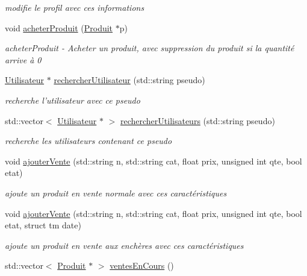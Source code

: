 \begin{DoxyCompactItemize}
\begin{DoxyCompactList}\small\item\em modifie le profil avec ces informations \end{DoxyCompactList}\item 
void \hyperlink{class_gestion_bdd_a34b4f9816d96e49889a6455f974e21ee}{acheter\-Produit} (\hyperlink{class_produit}{Produit} $\ast$p)
\begin{DoxyCompactList}\small\item\em acheter\-Produit -\/ Acheter un produit, avec suppression du produit si la quantité arrive à 0 \end{DoxyCompactList}\item 
\hyperlink{class_utilisateur}{Utilisateur} $\ast$ \hyperlink{class_gestion_bdd_a59989c7d58166c7e4a451b77e56bb852}{rechercher\-Utilisateur} (std\-::string pseudo)
\begin{DoxyCompactList}\small\item\em recherche l'utilisateur avec ce pseudo \end{DoxyCompactList}\item 
std\-::vector$<$ \hyperlink{class_utilisateur}{Utilisateur} $\ast$ $>$ \hyperlink{class_gestion_bdd_a96636fecdc9750ebd4236b3c58aed84f}{rechercher\-Utilisateurs} (std\-::string pseudo)
\begin{DoxyCompactList}\small\item\em recherche les utilisateurs contenant ce pseudo \end{DoxyCompactList}\item 
void \hyperlink{class_gestion_bdd_ac8c3809d6de97f0e81cd5045a4a72c7e}{ajouter\-Vente} (std\-::string n, std\-::string cat, float prix, unsigned int qte, bool etat)
\begin{DoxyCompactList}\small\item\em ajoute un produit en vente normale avec ces caractéristiques \end{DoxyCompactList}\item 
void \hyperlink{class_gestion_bdd_af4e95573213751d5487464ff3e24cc98}{ajouter\-Vente} (std\-::string n, std\-::string cat, float prix, unsigned int qte, bool etat, struct tm date)
\begin{DoxyCompactList}\small\item\em ajoute un produit en vente aux enchères avec ces caractéristiques \end{DoxyCompactList}\item 
std\-::vector$<$ \hyperlink{class_produit}{Produit} $\ast$ $>$ \hyperlink{class_gestion_bdd_aa52e1f2d076c4e3f65162e9f28ed20fa}{ventes\-En\-Cours} ()

\end{DoxyCompactItemize}
